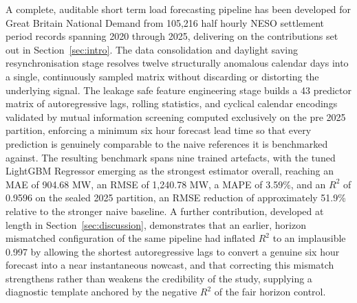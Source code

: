 \documentclass[runningheads]{llncs}
\begin{document}
A complete, auditable short term load forecasting pipeline has been developed for Great Britain National Demand from 105{,}216 half hourly NESO settlement period records spanning 2020 through 2025, delivering on the contributions set out in Section~\ref{sec:intro}. The data consolidation and daylight saving resynchronisation stage resolves twelve structurally anomalous calendar days into a single, continuously sampled matrix without discarding or distorting the underlying signal. The leakage safe feature engineering stage builds a 43 predictor matrix of autoregressive lags, rolling statistics, and cyclical calendar encodings validated by mutual information screening computed exclusively on the pre 2025 partition, enforcing a minimum six hour forecast lead time so that every prediction is genuinely comparable to the naive references it is benchmarked against. The resulting benchmark spans nine trained artefacts, with the tuned LightGBM Regressor emerging as the strongest estimator overall, reaching an MAE of 904.68 MW, an RMSE of 1{,}240.78 MW, a MAPE of 3.59\%, and an $R^2$ of 0.9596 on the sealed 2025 partition, an RMSE reduction of approximately 51.9\% relative to the stronger naive baseline. A further contribution, developed at length in Section~\ref{sec:discussion}, demonstrates that an earlier, horizon mismatched configuration of the same pipeline had inflated $R^2$ to an implausible 0.997 by allowing the shortest autoregressive lags to convert a genuine six hour forecast into a near instantaneous nowcast, and that correcting this mismatch strengthens rather than weakens the credibility of the study, supplying a diagnostic template anchored by the negative $R^2$ of the fair horizon control.
\end{document}
